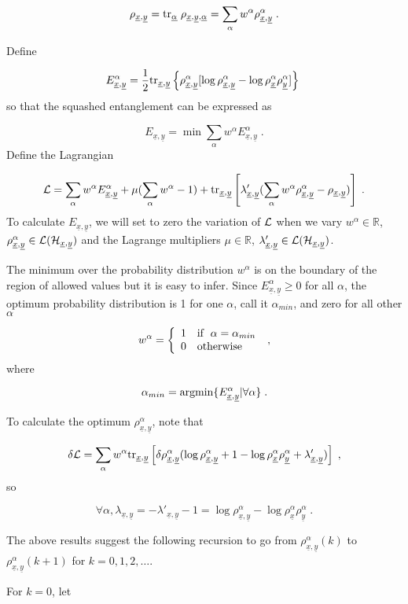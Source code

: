 \documentclass[12pt]{article}%
\newcommand{\tr}[0]{{\rm tr }}
\newcommand{\beq}{\begin{equation}}
\newcommand{\eeq}{\end{equation}}
\newcommand{\ul}[1]{\underline{#1}}
\newcommand{\RR}[0]{{ \mathbb{R}} }
\newcommand{\rvx}[0]{{\ul{x}}}
\newcommand{\rvy}[0]{{\ul{y}}}
\newcommand{\calh}[0]{{\cal H}}
\newcommand{\call}[0]{{\cal L}}
\newcommand{\lam}[0]{\lambda}
\newcommand{\rvalp}[0]{{\ul{\alpha}}}
\newcommand{\alp}[0]{{\alpha}}
\begin{document}
\beq
\rho_{\rvx, \rvy} =
\tr_\rvalp\; \rho_{\rvx, \rvy, \rvalp} =
\sum_\alp
w^\alp \rho_{\rvx, \rvy}^\alp
\;.
\eeq

Define


\beq
E^\alp_{\rvx, \rvy}=\frac{1}{2}\tr_{\rvx, \rvy}\left\{
\rho^{\alp}_{\rvx,\rvy}[
\log \rho^{\alp}_{\rvx,\rvy}
-
\log \rho^{\alp}_{\rvx}
\rho^{\alp}_{\rvy}]
\right\}
\;
\eeq
so that the squashed entanglement can be expressed as


\beq
E_{\rvx, \rvy}=\min
\sum_\alp w^\alp
E^\alp_{\rvx, \rvy}
\;.
\eeq
Define the Lagrangian

\beq
{\cal L}=
\sum_\alp w^\alp
E^\alp_{\rvx, \rvy}
+ \mu(\sum_\alp w^\alp -1)
+\tr_{\rvx, \rvy}\left[
\lam'_{\rvx, \rvy}(\sum_\alp w^\alp
\rho^\alp_{\rvx, \rvy}-\rho_{\rvx,\rvy})
\right]
\;.
\eeq
To calculate $E_{\rvx, \rvy}$, we will set to zero
the variation of $\call$ when we vary $w^\alp\in \RR$, $\rho^\alp_{\rvx,\rvy}
\in \call(\calh_{\rvx, \rvy})$
and the Lagrange multipliers $\mu\in \RR$, $\lam'_{\rvx, \rvy}\in\call(\calh_{\rvx, \rvy})$.

The minimum over the probability distribution $w^\alp$
is on the boundary of the region of allowed values but it is easy to
infer. Since $E^\alp_{\rvx, \rvy}\geq 0$ for all $\alp$,
the optimum probability distribution is 1 for one $\alp$,
call it $\alp_{min}$, and zero for all other $\alp$


\beq
w^\alp=
\left\{
\begin{array}{ll}
1&{\rm if}\;\; \alp=\alp_{min}\\
0&{\rm otherwise}
\end{array}
\right.
\;,
\eeq
where

\beq
\alp_{min} = {\rm argmin}\{E^\alp_{\rvx, \rvy}|\forall\alp\}
\;.
\eeq

To calculate the optimum $\rho^\alp_{\rvx,\rvy}$, note that

\beq
\delta{\cal L}=
\sum_\alp w^\alp\tr_{\rvx, \rvy}\left[\delta\rho^\alp_{\rvx,\rvy}
(\log \rho^\alp_{\rvx,\rvy}+1
-\log \rho^{\alp}_{\rvx}
\rho^{\alp}_{\rvy}
+\lam'_{\rvx,\rvy})\right]
\;,
\eeq
so

\beq
\forall \alp,
\lam_{\rvx, \rvy}=-\lam'_{\rvx, \rvy}-1
=
\log \rho^{\alp}_{\rvx,\rvy}
-
\log \rho^{\alp}_{\rvx}
\rho^{\alp}_{\rvy}
\;.
\eeq

The above results suggest
the following recursion to go from
$\rho^{\alp}_{\rvx,\rvy}(k)$
to $\rho^{\alp}_{\rvx,\rvy}(k+1)$ for $k=0,1,2,\ldots$.


For $k=0$, let
\end{document}
